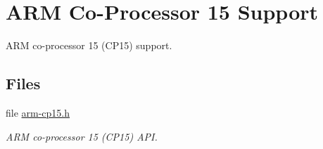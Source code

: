 \hypertarget{group__RTEMSScoreCPUARMCP15}{}\section{A\+RM Co-\/\+Processor 15 Support}
\label{group__RTEMSScoreCPUARMCP15}


A\+RM co-\/processor 15 (C\+P15) support.  


\subsection*{Files}
\begin{DoxyCompactItemize}
\item 
file \mbox{\hyperlink{arm-cp15_8h}{arm-\/cp15.\+h}}
\begin{DoxyCompactList}\small\item\em A\+RM co-\/processor 15 (C\+P15) A\+PI. \end{DoxyCompactList}\end{DoxyCompactItemize}
